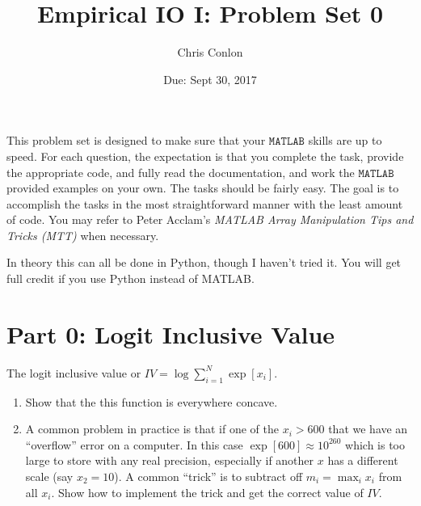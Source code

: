 \documentclass{article}
\begin{document}
\title{Empirical IO I: Problem Set 0}
\author{Chris Conlon}
\date{Due: Sept 30, 2017}
\maketitle
This problem set is designed to make sure that your $\mathtt{MATLAB}$ skills are up to speed. For each question, the expectation is that you complete the task, provide the appropriate code, and fully read the documentation, and work the $\mathtt{MATLAB}$ provided examples on your own.  The tasks should be fairly easy.  The goal is to accomplish the tasks in the most straightforward manner with the least amount of code.  You may refer to Peter Acclam's \emph{MATLAB Array Manipulation Tips and Tricks (MTT)} when necessary.

In theory this can all be done in Python, though I haven't tried it. You will get full credit if you use Python instead of MATLAB.


\section*{Part 0: Logit Inclusive Value}
The logit inclusive value or $IV = \log \sum_{i=1}^N \exp[x_i]$.
\begin{enumerate}
\item Show that the this function is everywhere concave.
\item A common problem in practice is that if one of the $x_i > 600$ that we have an ``overflow'' error on a computer. In this case $\exp[600] \approx 10^{260}$ which is too large to store with any real precision, especially if another $x$ has a different scale (say $x_2=10$). A common ``trick'' is to subtract off $m_i = \max_i x_i$ from all $x_i$.  Show how to implement the trick and get the correct value of $IV$.
\end{enumerate}
\end{document}
